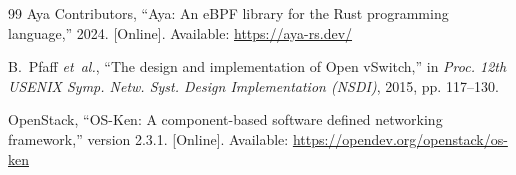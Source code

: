 \documentclass[conference]{IEEEtran}
\begin{document}
\begin{thebibliography}{99}
Aya Contributors, ``Aya: An eBPF library for the Rust programming language,'' 2024. [Online]. Available: \url{https://aya-rs.dev/}

B.~Pfaff \emph{et~al.}, ``The design and implementation of Open vSwitch,'' in \emph{Proc. 12th USENIX Symp. Netw. Syst. Design Implementation (NSDI)}, 2015, pp. 117--130.

OpenStack, ``OS-Ken: A component-based software defined networking framework,'' version 2.3.1. [Online]. Available: \url{https://opendev.org/openstack/os-ken}

\end{thebibliography}
\end{document}

